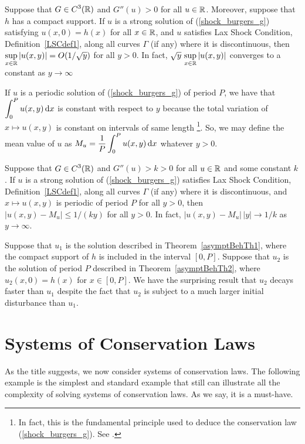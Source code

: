 \begin{theorem} \label{asymptBehTh1}
Suppose that $\displaystyle G \in C^3(\mathbb{R})$ and $G''(u) >0$ for all $u\in \mathbb{R}$.
Moreover, suppose that $h$ has a compact support.
If $u$ is a strong solution of (\ref{shock_burgers_g}) satisfying
$u(x,0) = h(x)$ for all $x \in \mathbb{R}$, and $u$ satisfies Lax Shock
Condition, Definition~\ref{LSCdef1}, along all curves $\Gamma$ (if
any) where it is discontinuous, then
$\displaystyle \sup_{x\in\mathbb{R}} |u(x,y)| = O(1/\sqrt{y})$ for all $y>0$.
In fact, $\displaystyle \sqrt{y}\, \sup_{x\in\mathbb{R}} |u(x,y)|$ converges to
a constant as $y \to \infty$
\end{theorem}

If $u$ is a periodic solution of (\ref{shock_burgers_g}) of period
$P$, we have that $\displaystyle \int_0^P u(x,y) \,\mathrm{d}{x}$ is constant
with respect to $y$ because the total variation of $x \mapsto u(x,y)$
is constant on intervals of same length \footnote{In fact, this is the
fundamental principle used to deduce the conservation law
(\ref{shock_burgers_g}).  See \cite{Lax2}.}.  So, we may define the
mean value of $u$ as
$\displaystyle M_u = \frac{1}{P}\int_0^P u(x,y) \,\mathrm{d}{x}$ whatever $y>0$.

\begin{theorem} \label{asymptBehTh2}
Suppose that $\displaystyle G \in C^3(\mathbb{R})$ and $G''(u) > k >0$
for all $u\in \mathbb{R}$ and some constant $k$.  If $u$ is a strong solution of
(\ref{shock_burgers_g}) satisfies Lax Shock Condition,
Definition~\ref{LSCdef1}, along all curves $\Gamma$ (if any) where it is
discontinuous, and $x\mapsto u(x,y)$ is periodic of period $P$
for all $y>0$, then
$\displaystyle |u(x,y) - M_u| \leq 1/(ky)$ for all $y>0$.
In fact, $|u(x,y) - M_u| \, |y| \to 1/k$ as $y \to \infty$.
\end{theorem}

Suppose that $u_1$ is the solution described in
Theorem~\ref{asymptBehTh1}, where the compact support of $h$ is
included in the interval $[0,P]$.
Suppose that $u_2$ is the solution of period $P$ described in
Theorem~\ref{asymptBehTh2}, where $u_2(x,0) = h(x)$ for $x\in[0,P]$.
We have the surprising result that $u_2$ decays faster than $u_1$
despite the fact that $u_2$ is subject to a much larger initial
disturbance than $u_1$.

\section{Systems of Conservation Laws}

As the title suggests, we now consider systems of conservation laws.
The following example is the simplest and standard example that still
can illustrate all the complexity of solving systems of conservation
laws.  As we say, it is a must-have.

